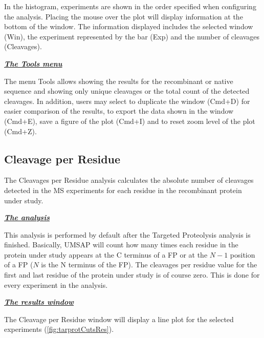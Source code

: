 In the histogram, experiments are shown in the order specified when configuring the
analysis. Placing the mouse over the plot will display information at the bottom of
the window. The information displayed includes the selected window (Win), the experiment
represented by the bar (Exp) and the number of cleavages (Cleavages).

\textit{\textbf{\underline{The Tools menu}}}

The menu Tools allows showing the results for the recombinant or native sequence and
showing only unique cleavages or the total count of the detected cleavages. In addition,
users may select to duplicate the window (Cmd+D) for easier comparison of the results,
to export the data shown in the window (Cmd+E), save a figure of the plot (Cmd+I)
and to reset zoom level of the plot (Cmd+Z).

\subsection{Cleavage per Residue}
\label{subsec:tarprotCutsRes}
The Cleavages per Residue analysis calculates the absolute number of cleavages detected
in the MS experiments for each residue in the recombinant protein under study.

\textit{\textbf{\underline{The analysis}}}

This analysis is performed by default after the Targeted Proteolysis analysis is
finished. Basically, UMSAP will count how many times each residue in the protein
under study appears at the C terminus of a FP or at the \(N-1\) position of a FP
(\(N\) is the N terminus of the FP). The cleavages per residue value for the first
and last residue of the protein under study is of course zero. This is done for
every experiment in the analysis.

\textit{\textbf{\underline{The results window}}}

The Cleavage per Residue window will display a line plot for the selected experiments
(\autoref{fig:tarprotCutsRes}).

